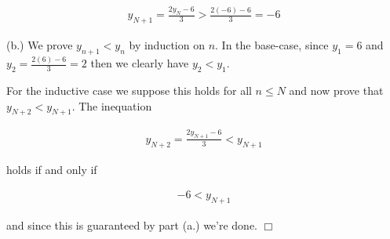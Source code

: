 \documentclass{article}
\begin{document}
\begin{align*}
    y_{N+1} = \frac{2y_N - 6}{3} > \frac{2(-6)-6}{3} = -6
\end{align*}

\vspace{1cm}

(b.) We prove $y_{n+1} < y_n$ by induction on $n$.  In the base-case, since $y_1 = 6$ and $y_2 = \frac{2(6)-6}{3}=2$ then we clearly have $y_2 < y_1$.

For the inductive case we suppose this holds for all $n\leq N$ and now prove that $y_{N+2} < y_{N+1}$.  The inequation

\begin{align*}
    y_{N+2} = \frac{2y_{N+1}-6}{3} < y_{N+1}
\end{align*}

holds if and only if

\begin{align*}
    -6 < y_{N+1}
\end{align*}

and since this is guaranteed by part (a.) we're done.  $\Box$
\end{document}
